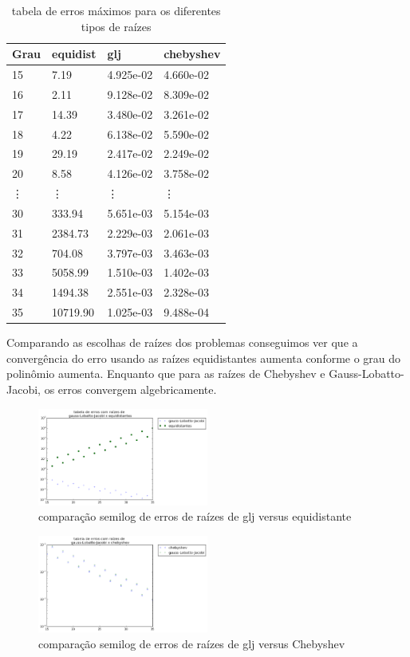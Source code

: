 \pagebreak
\begin{table}[h]
\centering
\caption{tabela de erros máximos para os diferentes tipos de raízes}
\label{my-label}
\begin{tabular}{|l|l|l|l|}
\hline
Grau & equidist & glj       & chebyshev     \\ \hline
15   & 7.19     & 4.925e-02 & 4.660e-02 \\
16   & 2.11     & 9.128e-02 & 8.309e-02 \\
17   & 14.39    & 3.480e-02 & 3.261e-02 \\
18   & 4.22     & 6.138e-02 & 5.590e-02 \\
19   & 29.19    & 2.417e-02 & 2.249e-02 \\
20   & 8.58     & 4.126e-02 & 3.758e-02 \\
\vdots   & \vdots              & \vdots    & \vdots    \\
30   & 333.94   & 5.651e-03 & 5.154e-03 \\
31   & 2384.73  & 2.229e-03 & 2.061e-03 \\
32   & 704.08   & 3.797e-03 & 3.463e-03 \\
33   & 5058.99  & 1.510e-03 & 1.402e-03 \\
34   & 1494.38  & 2.551e-03 & 2.328e-03 \\
35   & 10719.90 & 1.025e-03 & 9.488e-04 \\ \hline
\end{tabular}
\end{table}
Comparando as escolhas de raízes dos problemas conseguimos ver que a convergência do erro usando as raízes equidistantes aumenta conforme o grau do polinômio aumenta. Enquanto que para as raízes de Chebyshev e Gauss-Lobatto-Jacobi, os erros convergem algebricamente. 
\begin{figure}[!ht]
  \includegraphics[width=0.5\textwidth,center]{figuras/glj_equi.png}
  \caption{comparação semilog  de erros de raízes de glj versus equidistante }
\end{figure}
\begin{figure}[!hb]
  \includegraphics[width=0.5\textwidth,center]{figuras/glj_cheb.png}
  \caption{comparação semilog  de erros de raízes de glj versus Chebyshev}
\end{figure}
